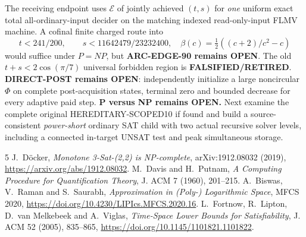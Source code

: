 \documentclass[11pt]{article}
\begin{document}
The receiving endpoint uses \(\mathcal E\) of jointly achieved \((t,s)\) for \emph{one} uniform exact total all-ordinary-input decider on the matching indexed read-only-input FLMV machine.  A cofinal finite charged route into
\[
 t<241/200,\qquad s<11642479/23232400,\quad
 \beta(c)=\tfrac12((c+2)/c^2-c)
\]
would suffice under \(P=NP\), but \textbf{ARC-EDGE-90 remains OPEN}. The old \(t+s<2\cos(\pi/7)\) universal forbidden region is \textbf{FALSIFIED/RETIRED}. \textbf{DIRECT-POST remains OPEN}: independently initialize a large noncircular \(\Phi\) on complete post-acquisition states, terminal zero and bounded decrease for every adaptive paid step. \textbf{P versus NP remains OPEN.} Next examine the complete original HEREDITARY-SCOPED10 if found and build a source-consistent \emph{power-short} ordinary SAT child with two actual recursive solver levels, including a connected in-target UNSAT test and peak simultaneous storage.

\begin{thebibliography}{5}
 J.~D\"ocker, \emph{Monotone 3-Sat-(2,2) is NP-complete}, arXiv:1912.08032 (2019), \url{https://arxiv.org/abs/1912.08032}.
 M.~Davis and H.~Putnam, \emph{A Computing Procedure for Quantification Theory}, J. ACM 7 (1960), 201--215.
 A.~Biswas, V.~Raman and S.~Saurabh, \emph{Approximation in (Poly-) Logarithmic Space}, MFCS 2020, \url{https://doi.org/10.4230/LIPIcs.MFCS.2020.16}.
 L.~Fortnow, R.~Lipton, D.~van Melkebeek and A.~Viglas, \emph{Time-Space Lower Bounds for Satisfiability}, J. ACM 52 (2005), 835--865, \url{https://doi.org/10.1145/1101821.1101822}.
\end{thebibliography}
\end{document}
